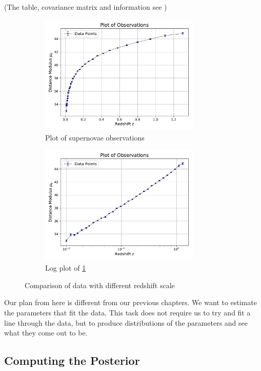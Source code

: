 \documentclass[12pt,twoside]{report}   %
\begin{document}
(The table, covariance matrix and information see \cite{5})
\begin{figure}[H]
\centering
\begin{subfigure}{0.5\linewidth}
  \centering
  \includegraphics[width = 3in]{SupernovaeDataCurve.pdf}
  \caption{Plot of supernovae observations}
  \label{fig:curve}
\end{subfigure}%
\begin{subfigure}{0.5\linewidth}
  \centering
  \includegraphics[width = 3in]{SupernovaeDataLog.pdf}
  \caption{Log plot of \ref{fig:curve}}
  \label{fig:log}
\end{subfigure}
\caption{Comparison of data with different redshift scale}
\label{fig:SupernoveData}
\end{figure}

Our plan from here is different from our previous chapters. We want to estimate the parameters that fit the data. This task does not require us to try and fit a line through the data, but to produce distributions of the parameters and see what they come out to be.
\pagebreak
\subsection{Computing the Posterior}\label{Computing the Posterior4}
\end{document}
